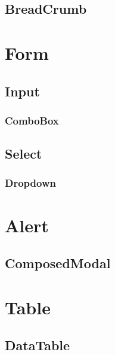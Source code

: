 \documentclass[11pt]{article}
\begin{document}
\subsection{BreadCrumb}
\label{sec:org45c135e}
\section{Form}
\label{sec:orgecf5c8d}
\subsection{Input}
\label{sec:org569ac6e}
\subsubsection{ComboBox}
\label{sec:org3891db3}
\subsection{Select}
\label{sec:orgc307249}
\subsubsection{Dropdown}
\label{sec:org9a17b10}
\section{Alert}
\label{sec:orgdcb2523}
\subsection{ComposedModal}
\label{sec:org4b89ac0}
\section{Table}
\label{sec:orgc4ee746}
\subsection{DataTable}
\label{sec:org00743f6}
\end{document}
